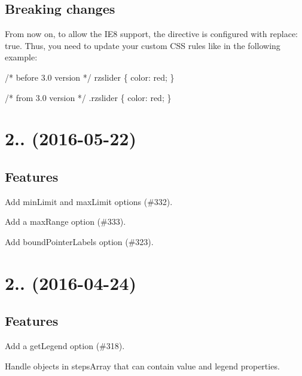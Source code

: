 \subsection*{Breaking changes}


\begin{DoxyItemize}
\item From now on, to allow the I\+E8 support, the directive is configured with {\ttfamily replace\+: true}. Thus, you need to update your custom C\+SS rules like in the following example\+: 
\begin{DoxyCode}
/* before 3.0 version */
rzslider \{
  color: red;
\}

/* from 3.0 version */
.rzslider \{
  color: red;
\}
\end{DoxyCode}

\end{DoxyItemize}

\section*{2.. (2016-\/05-\/22)}

\subsection*{Features}


\begin{DoxyItemize}
\item Add {\ttfamily min\+Limit} and {\ttfamily max\+Limit} options (\#332).
\item Add a {\ttfamily max\+Range} option (\#333).
\item Add {\ttfamily bound\+Pointer\+Labels} option (\#323).
\end{DoxyItemize}

\section*{2.. (2016-\/04-\/24)}

\subsection*{Features}


\begin{DoxyItemize}
\item Add a {\ttfamily get\+Legend} option (\#318).
\item Handle objects in {\ttfamily steps\+Array} that can contain {\ttfamily value} and {\ttfamily legend} properties.
\end{DoxyItemize}

